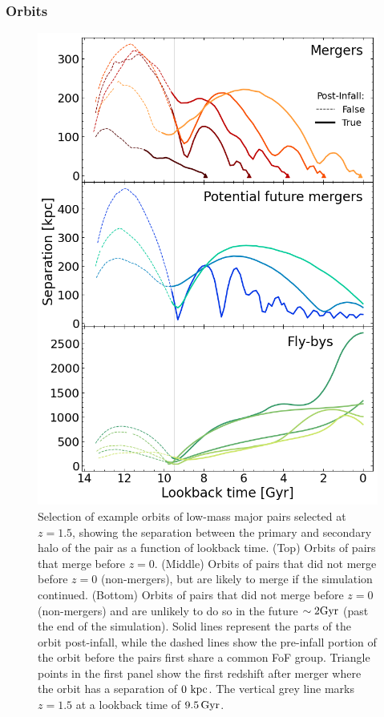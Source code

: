 \documentclass[twocolumn,linenumbers]{aastex631}
\begin{document}
\subsubsection{Orbits} 
\begin{figure}[htb]
    \begin{center}
    \includegraphics[width=\columnwidth, trim={0.4cm 1.75cm 1cm 3.5cm}, clip]{plots/bet-on-it/5_exampleorbits.png}
    \caption{Selection of example orbits of low-mass major pairs selected at $z=1.5$, showing the separation between the primary and secondary halo of the pair as a function of lookback time. 
    (Top) Orbits of pairs that merge before $z=0$.
    (Middle) Orbits of pairs that did not merge before $z=0$ (non-mergers), but are likely to merge if the simulation continued. 
    (Bottom) Orbits of pairs that did not merge before $z=0$ (non-mergers) and are unlikely to do so in the future $\sim2\mathrm{Gyr}$ (past the end of the simulation).
    Solid lines represent the parts of the orbit post-infall, while the dashed lines show the pre-infall portion of the orbit before the pairs first share a common FoF group. 
    Triangle points in the first panel show the first redshift after merger where the orbit has a separation of $0\,\mathrm{\,kpc}$.
    The vertical grey line marks $z=1.5$ at a lookback time of $9.5\,\mathrm{Gyr}$.
    }
    \label{fig:example-orbits}
    \end{center}
\end{figure}
\end{document}
